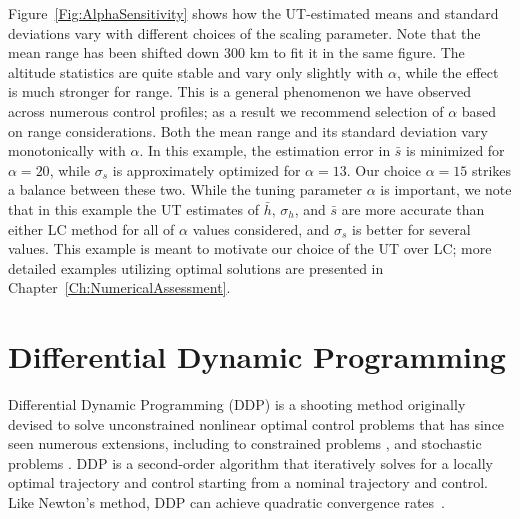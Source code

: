 Figure~\ref{Fig:AlphaSensitivity} shows how the UT-estimated means and standard deviations vary with different choices of the scaling parameter. Note that the mean range has been shifted down 300 km to fit it in the same figure. The altitude statistics are quite stable and vary only slightly with $\alpha$, while the effect is much stronger for range. This is a general phenomenon we have observed across numerous control profiles; as a result we recommend selection of $\alpha$ based on range considerations. 
Both the mean range and its standard deviation vary monotonically with $\alpha$. In this example, the estimation error in $\bar{s}$ is minimized for $\alpha = 20$, while $\sigma_s$ is approximately optimized for $\alpha = 13$. Our choice $\alpha=15$ strikes a balance between these two. 
While the tuning parameter $\alpha$ is important, we note that in this example the UT estimates of $\bar{h},\,\sigma_h$, and $\bar{s}$ are more accurate than either LC method for all of $\alpha$ values considered, and $\sigma_s$ is better for several values.
This example is meant to motivate our choice of the UT over LC; more detailed examples utilizing optimal solutions are presented in Chapter~\ref{Ch:NumericalAssessment}. 

\section{Differential Dynamic Programming}\label{Sec:DDP}
Differential Dynamic Programming (DDP) is a shooting method originally devised to solve unconstrained nonlinear optimal control problems that has since seen numerous extensions, including to constrained problems \cite{DDP_ControlLimited,HDDP1,HDDP2,DDP_NonlinearConstraints,DDP_InteriorPoint}, and stochastic problems \cite{iLQG, DDP_Stochastic, ozaki_UT,ozaki2020tube}. DDP is a second-order algorithm that iteratively solves for a locally optimal trajectory and control starting from a nominal trajectory and control. Like Newton's method, DDP can achieve quadratic convergence rates~\cite{DDP}.

